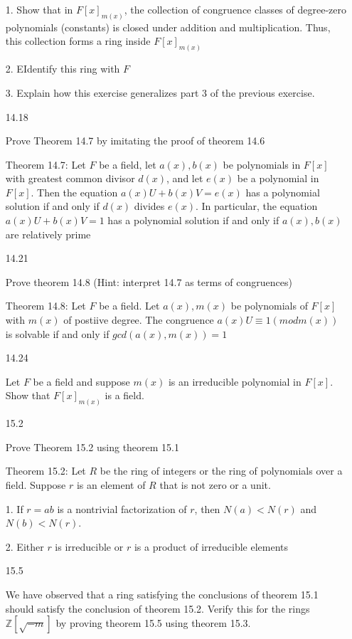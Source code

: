 \documentclass[12pt]{article}
\begin{document}
\begin{itemize}
	1. Show that in $F[x]_{m(x)}$, the collection of congruence classes of degree-zero polynomials (constants) is closed under addition and multiplication. Thus, this collection forms a ring inside $F[x]_{m(x)}$

	2. EIdentify this ring with $F$

	3. Explain how this exercise generalizes part 3 of the previous exercise.

\newpage 
\item[14.18]

Prove Theorem 14.7 by imitating the proof of theorem 14.6

		Theorem 14.7: Let $F$ be a field, let $a(x), b(x)$ be polynomials in $F[x]$ with greatest common divisor $d(x)$, and let $e(x)$ be a polynomial in $F[x]$. Then the equation $a(x)U + b(x)V = e(x)$ has a polynomial solution if and only if $d(x)$ divides $e(x)$. In particular, the equation $a(x)U + b(x)V = 1$ has a polynomial solution if and only if $a(x), b(x)$ are relatively prime

\newpage 
\item[14.21]

	Prove theorem 14.8 (Hint: interpret 14.7 as terms of congruences)

	Theorem 14.8: Let $F$ be a field. Let $a(x), m(x)$ be polynomials of $F[x]$ with $m(x)$ of postiive degree. The congruence $a(x)U \equiv 1 (modm(x))$ is solvable if and only if $gcd(a(x),m(x)) = 1$

\newpage 
\item[14.24]

	Let $F$ be a field and suppose $m(x)$ is an irreducible polynomial in $F[x]$. Show that $F[x]_{m(x)}$ is a field.



\newpage 
\item[15.2]

	Prove Theorem 15.2 using theorem 15.1

	Theorem 15.2:	Let $R$ be the ring of integers or the ring of polynomials over a field. Suppose $r$ is an element of $R$ that is not zero or a unit.

	1. If $r = ab$ is a nontrivial factorization of $r$, then $N(a) < N(r)$ and $N(b) < N(r)$.

	2. Either $r$ is irreducible or $r$ is a product of irreducible elements

\newpage 
\item[15.5]

	We have observed that a ring satisfying the conclusions of theorem 15.1 should satisfy the conclusion of theorem 15.2. Verify this for the rings $\mathbb{Z}[\sqrt{-m}]$ by proving theorem 15.5 using theorem 15.3.


\end{itemize}
\end{document}
